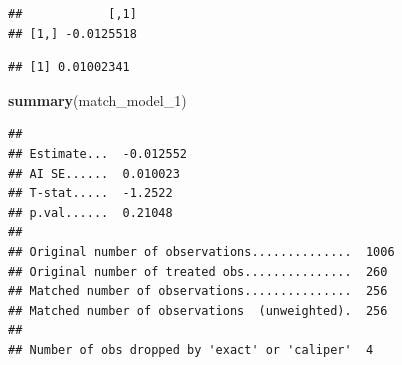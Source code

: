 \documentclass[
]{article}
\newenvironment{Shaded}{\begin{snugshade}}{\end{snugshade}}
\newcommand{\CommentTok}[1]{\textcolor[rgb]{0.56,0.35,0.01}{\textit{#1}}}
\newcommand{\FunctionTok}[1]{\textcolor[rgb]{0.13,0.29,0.53}{\textbf{#1}}}
\newcommand{\NormalTok}[1]{#1}
\newcommand{\SpecialCharTok}[1]{\textcolor[rgb]{0.81,0.36,0.00}{\textbf{#1}}}
\begin{document}
\begin{Shaded}
\end{Shaded}

\begin{Shaded}
\end{Shaded}

\begin{verbatim}
##            [,1]
## [1,] -0.0125518
\end{verbatim}

\begin{Shaded}
\end{Shaded}

\begin{verbatim}
## [1] 0.01002341
\end{verbatim}

\begin{Shaded}
\begin{Highlighting}[]
\FunctionTok{summary}\NormalTok{(match\_model\_1)}
\end{Highlighting}
\end{Shaded}

\begin{verbatim}
## 
## Estimate...  -0.012552 
## AI SE......  0.010023 
## T-stat.....  -1.2522 
## p.val......  0.21048 
## 
## Original number of observations..............  1006 
## Original number of treated obs...............  260 
## Matched number of observations...............  256 
## Matched number of observations  (unweighted).  256 
## 
## Number of obs dropped by 'exact' or 'caliper'  4
\end{verbatim}
\end{document}

